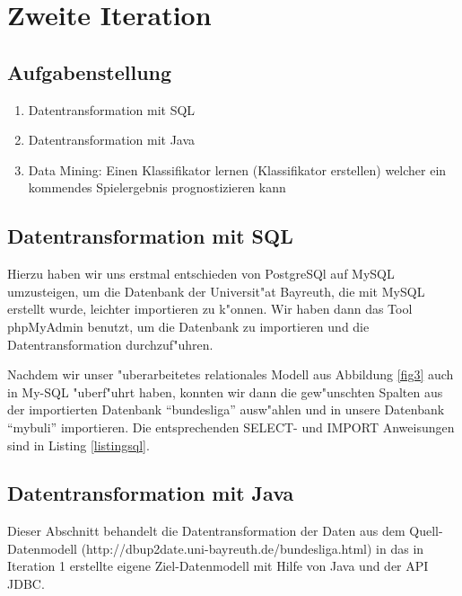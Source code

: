 \documentclass[
10pt,
a4paper
]{scrartcl}
\begin{document}
\section{ Zweite Iteration}

\subsection{Aufgabenstellung}

\begin{enumerate}
  \item Datentransformation mit SQL  
  \item Datentransformation mit Java
  \item Data Mining: Einen Klassifikator lernen (Klassifikator erstellen) welcher ein kommendes Spielergebnis prognostizieren kann
\end{enumerate}

\subsection{Datentransformation mit SQL}
Hierzu haben wir uns erstmal entschieden von PostgreSQl auf MySQL umzusteigen, um die Datenbank der Universit"at Bayreuth, die mit MySQL erstellt wurde, leichter importieren zu k"onnen. Wir haben dann das Tool phpMyAdmin benutzt, um die Datenbank zu importieren und die Datentransformation durchzuf"uhren.

Nachdem wir unser "uberarbeitetes relationales Modell aus Abbildung \ref{fig3} auch in My{-}SQL "uberf"uhrt haben, konnten wir dann die gew"unschten Spalten aus der importierten Datenbank "`bundesliga"' ausw"ahlen und in unsere Datenbank "`mybuli"' importieren. Die entsprechenden SELECT- und IMPORT Anweisungen sind in Listing \ref{listingsql}.



\subsection{Datentransformation mit Java}

Dieser Abschnitt behandelt die Datentransformation der Daten aus dem Quell-Datenmodell (http://dbup2date.uni-bayreuth.de/bundesliga.html) in das in Iteration 1 erstellte eigene Ziel-Datenmodell mit Hilfe von Java und der API JDBC.\\
\end{document}

